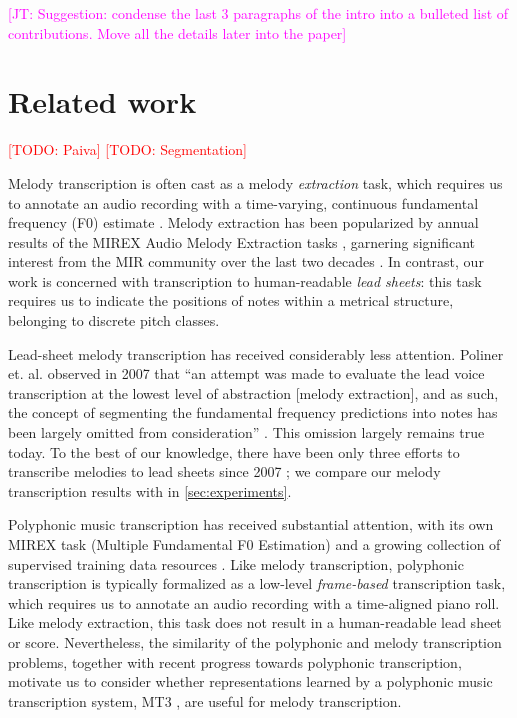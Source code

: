 \documentclass{article}
\newcommand{\todo}[1]{\textcolor{red}{[TODO: #1]}}
\newcommand\john[1]{\textcolor{magenta}{[JT: #1]}}
\begin{document}
\john{Suggestion: condense the last 3 paragraphs of the intro into a bulleted list of contributions. Move all the details later into the paper}

\section{Related work}

\todo{Paiva}
\todo{Segmentation}

Melody transcription is often cast as a melody \emph{extraction} task, which requires us to annotate an audio recording with a time-varying, continuous fundamental frequency (F0) estimate \cite{goto2004real}. Melody extraction has been popularized by annual results of the MIREX Audio Melody Extraction tasks \cite{downie2014ten}, garnering significant interest from the MIR community over the last two decades \cite{salamon2014melody,rao2022melody}. In contrast, our work is concerned with transcription to human-readable \emph{lead sheets}: this task requires us to indicate the positions of notes within a metrical structure, belonging to discrete pitch classes.

Lead-sheet melody transcription has received considerably less attention. Poliner et. al. observed in 2007 that ``an attempt was made to evaluate the lead voice transcription at the lowest level of abstraction [melody extraction], and as such, the concept of segmenting the fundamental frequency predictions into notes has been largely omitted from consideration'' \cite{poliner2007melody}. This omission largely remains true today. To the best of our knowledge, there have been only three efforts to transcribe melodies to lead sheets since 2007 \cite{ryynanen2008automatic,weil2009automatic,laaksonen2014automatic}; we compare our melody transcription results with \cite{ryynanen2008automatic} in \cref{sec:experiments}.

Polyphonic music transcription has received substantial attention, with its own MIREX task (Multiple Fundamental F0 Estimation) and a growing collection of supervised training data resources \cite{benetos2013automatic,thickstun2017learning,hawthorne2019enabling,manilow2019cutting}. Like melody transcription, polyphonic transcription is typically formalized as a low-level \emph{frame-based} transcription task, which requires us to annotate an audio recording with a time-aligned piano roll. Like melody extraction, this task does not result in a human-readable lead sheet or score. Nevertheless, the similarity of the polyphonic and melody transcription problems, together with recent progress towards polyphonic transcription, motivate us to consider whether representations learned by a polyphonic music transcription system, MT3 \cite{gardner2021mt3}, are useful for melody transcription.
\end{document}

